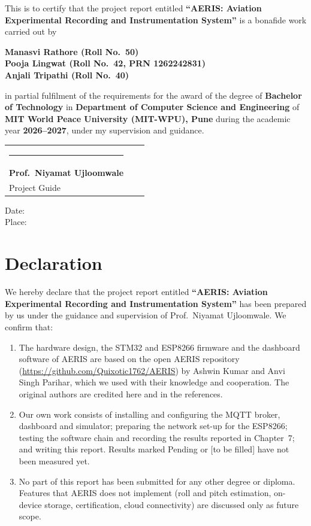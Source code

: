 \documentclass[12pt,a4paper]{report}
\newcommand{\projecttitle}{AERIS: Aviation Experimental Recording and Instrumentation System}
\newcommand{\studentnames}{Manasvi Rathore (Roll No.\ 50)\\Pooja Lingwat (Roll No.\ 42, PRN 1262242831)\\Anjali Tripathi (Roll No.\ 40)}
\newcommand{\guidename}{Prof.\ Niyamat Ujloomwale}
\newcommand{\department}{Department of Computer Science and Engineering}
\newcommand{\universityname}{MIT World Peace University (MIT-WPU), Pune}
\newcommand{\degreename}{Bachelor of Technology}
\newcommand{\academicyear}{2026--2027}
\begin{document}
\noindent This is to certify that the project report entitled
\textbf{``\projecttitle''} is a bonafide work carried out by

\begin{center}
\textbf{\studentnames}
\end{center}

\noindent in partial fulfilment of the requirements for the award of the degree of
\textbf{\degreename} in \textbf{\department} of \textbf{\universityname}
during the academic year \textbf{\academicyear}, under my supervision and guidance.

\vspace{2.2cm}
\noindent
\begin{tabularx}{\textwidth}{XXX}
\rule{4cm}{0.4pt} & \\
\textbf{\guidename}\\
Project Guide & \\
\end{tabularx}

\vspace{1.5cm}
\noindent Date: \hrulefill \\[0.3cm]
Place: \hrulefill

\chapter*{Declaration}
We hereby declare that the project report entitled \textbf{``\projecttitle''} has been prepared by us under the guidance and supervision of \guidename. We confirm that:
\begin{enumerate}
\item The hardware design, the STM32 and ESP8266 firmware and the dashboard software of AERIS are based on the open AERIS repository (\url{https://github.com/Quixotic1762/AERIS}) by Ashwin Kumar and Anvi Singh Parihar, which we used with their knowledge and cooperation. The original authors are credited here and in the references.
\item Our own work consists of installing and configuring the MQTT broker, dashboard and simulator; preparing the network set-up for the ESP8266; testing the software chain and recording the results reported in Chapter~7; and writing this report. Results marked Pending or [to be filled] have not been measured yet.
\item No part of this report has been submitted for any other degree or diploma. Features that AERIS does not implement (roll and pitch estimation, on-device storage, certification, cloud connectivity) are discussed only as future scope.
\end{enumerate}
\end{document}
